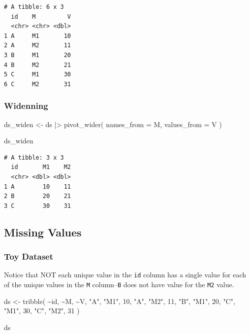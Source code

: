 \documentclass[
  letterpaper,
  DIV=11,
  numbers=noendperiod]{scrreprt}
\newenvironment{Shaded}{\begin{snugshade}}{\end{snugshade}}
\newcommand{\AttributeTok}[1]{\textcolor[rgb]{0.40,0.45,0.13}{#1}}
\newcommand{\DecValTok}[1]{\textcolor[rgb]{0.68,0.00,0.00}{#1}}
\newcommand{\FunctionTok}[1]{\textcolor[rgb]{0.28,0.35,0.67}{#1}}
\newcommand{\NormalTok}[1]{\textcolor[rgb]{0.00,0.23,0.31}{#1}}
\newcommand{\OtherTok}[1]{\textcolor[rgb]{0.00,0.23,0.31}{#1}}
\newcommand{\SpecialCharTok}[1]{\textcolor[rgb]{0.37,0.37,0.37}{#1}}
\newcommand{\StringTok}[1]{\textcolor[rgb]{0.13,0.47,0.30}{#1}}
\begin{document}
\begin{verbatim}
# A tibble: 6 x 3
  id    M         V
  <chr> <chr> <dbl>
1 A     M1       10
2 A     M2       11
3 B     M1       20
4 B     M2       21
5 C     M1       30
6 C     M2       31
\end{verbatim}

\subsubsection{Widenning}\label{widenning}

\begin{Shaded}
\begin{Highlighting}[]
\NormalTok{ds\_widen }\OtherTok{\textless{}{-}}\NormalTok{ ds }\SpecialCharTok{|\textgreater{}} 
  \FunctionTok{pivot\_wider}\NormalTok{(}
    \AttributeTok{names\_from =}\NormalTok{ M,}
    \AttributeTok{values\_from =}\NormalTok{ V}
\NormalTok{  )}

\NormalTok{ds\_widen}
\end{Highlighting}
\end{Shaded}

\begin{verbatim}
# A tibble: 3 x 3
  id       M1    M2
  <chr> <dbl> <dbl>
1 A        10    11
2 B        20    21
3 C        30    31
\end{verbatim}

\subsection{Missing Values}\label{missing-values}

\subsubsection{Toy Dataset}\label{toy-dataset-4}

Notice that NOT each unique value in the \texttt{id} column has a single
value for each of the unique values in the \texttt{M} column--\texttt{B}
does not have value for the \texttt{M2} value.

\begin{Shaded}
\begin{Highlighting}[]
\NormalTok{ds }\OtherTok{\textless{}{-}} \FunctionTok{tribble}\NormalTok{(}
  \SpecialCharTok{\textasciitilde{}}\NormalTok{id, }\SpecialCharTok{\textasciitilde{}}\NormalTok{M, }\SpecialCharTok{\textasciitilde{}}\NormalTok{V,}
  \StringTok{"A"}\NormalTok{, }\StringTok{"M1"}\NormalTok{, }\DecValTok{10}\NormalTok{,}
  \StringTok{"A"}\NormalTok{, }\StringTok{"M2"}\NormalTok{, }\DecValTok{11}\NormalTok{,}
  \StringTok{"B"}\NormalTok{, }\StringTok{"M1"}\NormalTok{, }\DecValTok{20}\NormalTok{,}
  \StringTok{"C"}\NormalTok{, }\StringTok{"M1"}\NormalTok{, }\DecValTok{30}\NormalTok{,}
  \StringTok{"C"}\NormalTok{, }\StringTok{"M2"}\NormalTok{, }\DecValTok{31}
\NormalTok{)}

\NormalTok{ds}
\end{Highlighting}
\end{Shaded}
\end{document}
